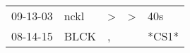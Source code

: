 \begin{supertabular}{lllll}
 09-13-03 &  nckl &  \textgreater &  \textgreater &    40s \\
 08-14-15 &  BLCK &             , &               &  *CS1* \\
\end{supertabular}
